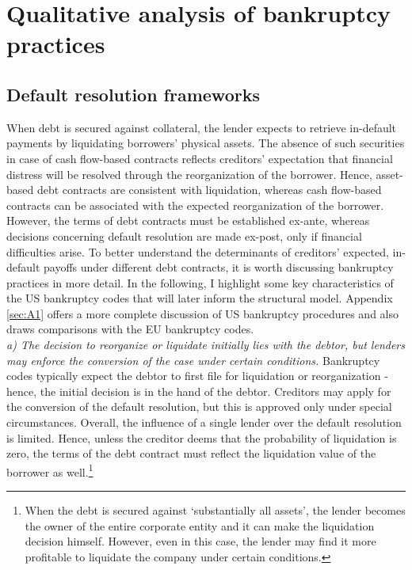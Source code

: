\documentclass[12pt]{article}
\begin{document}
\section{Qualitative analysis of bankruptcy practices \label{sec: qualitative analysis}}
\subsection{Default resolution frameworks \label{sec: default resolutions}}
When debt is secured against collateral, the lender expects to retrieve in-default payments by liquidating borrowers’ physical assets. The absence of such securities in case of cash flow-based contracts reflects creditors’ expectation that financial distress will be resolved through the reorganization of the borrower. Hence, asset-based debt contracts are consistent with liquidation, whereas cash flow-based contracts can be associated with the expected reorganization of the borrower.  \vspace{3mm} \\
However, the terms of debt contracts must be established ex-ante, whereas decisions concerning default resolution are made ex-post, only if financial difficulties arise. To better understand the determinants of creditors' expected, in-default payoffs under different debt contracts, it is worth discussing bankruptcy practices in more detail. In the following, I highlight some key characteristics of the US bankruptcy codes that will later inform the structural model. Appendix \ref{sec:A1} offers a more complete discussion of US bankruptcy procedures and also draws comparisons with the EU bankruptcy codes. \vspace{3mm} \\
\textit{a) The decision to reorganize or liquidate initially lies with the debtor, but lenders may enforce the conversion of the case under certain conditions.} Bankruptcy codes typically expect the debtor to first file for liquidation or reorganization - hence, the initial decision is in the hand of the debtor. Creditors may apply for the conversion of the default resolution, but this is approved only under special circumstances. Overall, the influence of a single lender over the default resolution is limited. Hence, unless the creditor deems that the probability of liquidation is zero, the terms of the debt contract must reflect the liquidation value of the borrower as well.\footnote{When the debt is secured against `substantially all assets', the lender becomes the owner of the entire corporate entity and it can make the liquidation decision himself. However, even in this case, the lender may find it more profitable to liquidate the company under certain conditions.}  \vspace{3mm} \\
\end{document}
